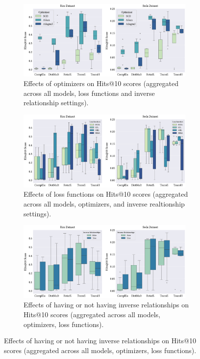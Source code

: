 \begin{figure}[!ht]
    \centering
    \begin{subfigure}[b]{\textwidth}
        \centering
        \includegraphics[width=0.96\textwidth]{figures/hits@10_across_all_models_and_optimizers.eps}
        \caption{Effects of optimizers on Hits@10 scores (aggregated across all models, loss functions and inverse relationship settings).}
        \label{subfig:hits@10_across_all_models_and_optimizers}
    \end{subfigure}
    
    \begin{subfigure}[b]{\textwidth}
        \centering
        \includegraphics[width=0.96\textwidth]{figures/hits@10_across_all_models_and_loss_functions.eps}
        \caption{Effects of loss functions on Hits@10 scores (aggregated across all models, optimizers, and inverse realtionship settings).}
        \label{subfig:hits@10_across_all_models_and_loss_functions}
    \end{subfigure}
    
    \begin{subfigure}[b]{\textwidth}
        \centering
        \includegraphics[width=0.96\textwidth]{figures/hits@10_across_all_models_with_inverse_relations_present_or_absent.eps}
        \caption{Effects of having or not having inverse relationships on Hits@10 scores (aggregated across all models, optimizers, loss functions).}
\label{subfig:hits@10_across_all_models_with_inverse_relations_present_or_absent}
    \end{subfigure}
    

\end{figure}
